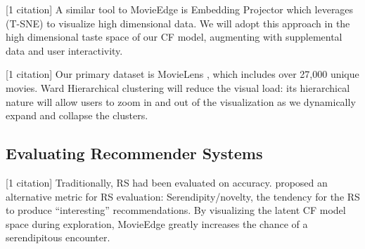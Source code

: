 [1 citation] A similar tool to MovieEdge is Embedding Projector \cite{smilkov2016embedding} which leverages \mbox{(T-SNE)} to visualize high dimensional data. We will adopt this approach in the high dimensional taste space of our CF model, augmenting with supplemental data and user interactivity. 

[1 citation] Our primary dataset is MovieLens \cite{harper2016movielens}, which includes over 27,000 unique movies. Ward Hierarchical clustering \cite{ward1963hierarchical} will reduce the visual load:  its hierarchical nature will allow users to zoom in and out of the visualization as we dynamically expand and collapse the clusters.

\subsection{Evaluating Recommender Systems}

[1 citation] Traditionally, RS had been evaluated on accuracy. \cite{herlocker2004evaluating} proposed an alternative metric for RS evaluation: Serendipity/novelty, the tendency for the RS to produce  “interesting” recommendations. By visualizing the latent CF model space during exploration, MovieEdge greatly increases the chance of a serendipitous encounter.


